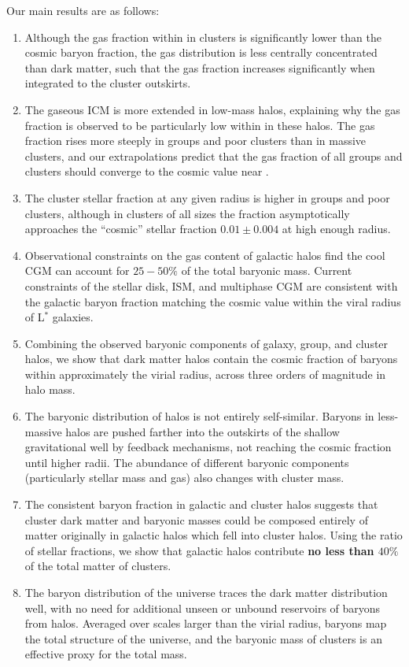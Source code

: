 Our main results are as follows:
\begin{enumerate}
\item Although the gas fraction within \rfive{} in clusters is
  significantly lower than the cosmic baryon fraction, the gas
  distribution is less centrally concentrated than dark matter, such
  that the gas fraction increases significantly when integrated to the
  cluster outskirts.
\item The gaseous ICM is more extended in low-mass halos, explaining
  why the gas fraction is observed to be particularly low within
  \rfive{} in these halos. The gas fraction rises more steeply in
  groups and poor clusters than in massive clusters, and our
  extrapolations predict that the gas fraction of all groups and
  clusters should converge to the cosmic value near \rvir{}.
\item The cluster stellar fraction at any given radius is higher in
  groups and poor clusters, although in clusters of all sizes the
  fraction asymptotically approaches the ``cosmic'' stellar fraction
  $0.01\pm0.004$ at high enough radius. 
\item Observational constraints on the gas content of galactic halos
  find the cool CGM can account for $25-50\%$ of the total baryonic
  mass. Current constraints of the stellar disk, ISM, and multiphase
  CGM are consistent with the galactic baryon fraction matching the
  cosmic value within the viral radius of L$^*$ galaxies.
\item Combining the observed baryonic components of galaxy, group, and
  cluster halos, we show that dark matter halos contain the cosmic
  fraction of baryons within approximately the virial radius, across
  three orders of magnitude in halo mass. 
\item The baryonic distribution of halos is not entirely
  self-similar. Baryons in less-massive halos are pushed farther into
  the outskirts of the shallow gravitational well by feedback
  mechanisms, not reaching the
  cosmic fraction until higher radii. The abundance of different
  baryonic components (particularly stellar mass and gas) also changes
  with cluster mass.
\item The consistent baryon fraction in galactic and cluster halos
  suggests that cluster dark matter and baryonic masses could be
  composed entirely of matter originally in galactic halos which fell
  into cluster halos. Using the ratio of stellar fractions, we
  show that galactic halos contribute \textbf{no less than $40\%$} of
  the total matter of clusters. 
\item The baryon distribution of the universe traces the dark matter
  distribution well, with no need for additional unseen or unbound
  reservoirs of baryons from halos. Averaged over scales larger than
  the virial radius, baryons map the total structure of the universe,
  and the baryonic mass of clusters is an effective proxy for the
  total mass.
\end{enumerate}

